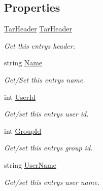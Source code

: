 \subsection*{Properties}
\begin{DoxyCompactItemize}
\item 
\hyperlink{class_i_c_sharp_code_1_1_sharp_zip_lib_1_1_tar_1_1_tar_header}{Tar\+Header} \hyperlink{class_i_c_sharp_code_1_1_sharp_zip_lib_1_1_tar_1_1_tar_entry_a559b96ddbffad5fc9fe103ae0a0a9a3e}{Tar\+Header}
\begin{DoxyCompactList}\small\item\em Get this entry\textquotesingle{}s header. \end{DoxyCompactList}\item 
string \hyperlink{class_i_c_sharp_code_1_1_sharp_zip_lib_1_1_tar_1_1_tar_entry_aa9df01474a99b337d088bc46c83758f1}{Name}
\begin{DoxyCompactList}\small\item\em Get/\+Set this entry\textquotesingle{}s name. \end{DoxyCompactList}\item 
int \hyperlink{class_i_c_sharp_code_1_1_sharp_zip_lib_1_1_tar_1_1_tar_entry_afd59b4413a81c3c084c8711500715e98}{User\+Id}
\begin{DoxyCompactList}\small\item\em Get/set this entry\textquotesingle{}s user id. \end{DoxyCompactList}\item 
int \hyperlink{class_i_c_sharp_code_1_1_sharp_zip_lib_1_1_tar_1_1_tar_entry_af106c01e135300df582517640f4627c2}{Group\+Id}
\begin{DoxyCompactList}\small\item\em Get/set this entry\textquotesingle{}s group id. \end{DoxyCompactList}\item 
string \hyperlink{class_i_c_sharp_code_1_1_sharp_zip_lib_1_1_tar_1_1_tar_entry_a9b33a562471529e950c171077c282b3c}{User\+Name}
\begin{DoxyCompactList}\small\item\em Get/set this entry\textquotesingle{}s user name. \end{DoxyCompactList}\item 

\end{DoxyCompactItemize}
